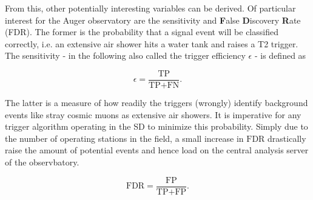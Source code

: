 From this, other potentially interesting variables can be derived. Of particular interest for the Auger observatory are the sensitivity and \textbf{F}alse 
\textbf{D}iscovery \textbf{R}ate (FDR). The former is the probability that a signal event will be classified correctly, i.e. an extensive air shower hits a 
water tank and raises a T2 trigger. The sensitivity - in the following also called the trigger efficiency $\epsilon$ - is defined as

\begin{equation}
	\label{eq:statistics-efficiency}
	\epsilon = \frac{\text{TP}}{\text{TP} + \text{FN}}.
\end{equation}

The latter is a measure of how readily the triggers (wrongly) identify background events like stray cosmic muons as extensive air showers. It is imperative 
for any trigger algorithm operating in the SD to minimize this probability. Simply due to the number of operating stations in the field, a small increase in 
$\text{FDR}$ drastically raise the amount of potential events and hence load on the central analysis server of the observbatory.

\begin{equation}
	\label{eq:statistics-efficiency}
	\text{FDR} = \frac{\text{FP}}{\text{TP} + \text{FP}}.
\end{equation}

